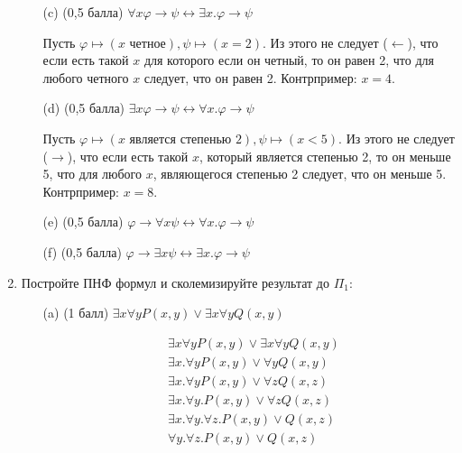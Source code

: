 \begin{enumerate}
\begin{itemize}
        \item[(c)] (0,5 балла) $\forall x\varphi \rightarrow \psi \leftrightarrow \exists x. \varphi \rightarrow \psi$
        \begin{solution}
            Пусть $\varphi \mapsto (x \text{ четное}), \psi \mapsto (x = 2)$. Из этого не следует ($\leftarrow$), что если есть такой $x$ для которого если он четный, то он равен 2, что для любого четного $x$ следует, что он равен 2. Контрпример: $x = 4$.
        \end{solution}
        \item[(d)] (0,5 балла) $\exists x\varphi \rightarrow \psi \leftrightarrow \forall x. \varphi \rightarrow \psi$
        \begin{solution}
            Пусть $\varphi \mapsto (x \text{ является степенью 2}), \psi \mapsto (x < 5)$. Из этого не следует ($\rightarrow$), что если есть такой $x$, который является степенью 2, то он меньше 5, что для любого $x$, являющегося степенью 2 следует, что он меньше 5. Контрпример: $x = 8$.
        \end{solution}
        \item[(e)] (0,5 балла) $\varphi \rightarrow \forall x\psi \leftrightarrow \forall x. \varphi \rightarrow \psi$
        \item[(f)] (0,5 балла) $\varphi \rightarrow \exists x\psi \leftrightarrow \exists x. \varphi \rightarrow \psi$
    \end{itemize}
    \item Постройте ПНФ формул и сколемизируйте результат до $\Pi_1$:
    \begin{itemize}
        \item[(a)] (1 балл) $\exists x\forall y P(x, y) \lor \exists x\forall y Q(x, y)$
        \begin{solution}
            \begin{align*}
                &\exists x\forall y P(x, y) \lor \exists x\forall y Q(x, y) \\
                &\exists x . \forall y P(x, y) \lor \forall y Q(x, y) \\
                &\exists x . \forall y P(x, y) \lor \forall z Q(x, z) \\
                &\exists x . \forall y. P(x, y) \lor \forall z Q(x, z) \\
                &\exists x . \forall y. \forall z . P(x, y) \lor Q(x, z) \\
                &\forall y. \forall z . P(x, y) \lor Q(x, z)
            \end{align*}

\end{solution}
\end{itemize}
\end{enumerate}
